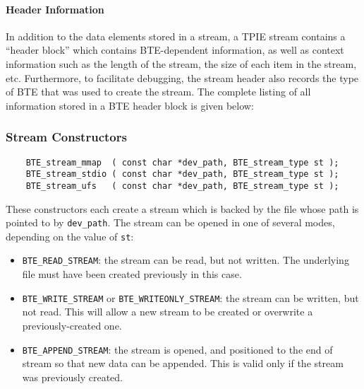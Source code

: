 
\paragraph{Header Information} In addition to the data elements stored
in a stream, a TPIE stream contains a ``header
block'' which contains BTE-dependent
information, as well as context information such as the length of the
stream, the size of each item in the stream, etc.  Furthermore, to
facilitate debugging, the stream header also records the type of BTE
that was used to create the stream. The complete listing of all
information stored in a BTE header block is given below:



\vspace*{\baselineskip}
\subsubsection{Stream Constructors}

\begin{lstlisting}
    BTE_stream_mmap  ( const char *dev_path, BTE_stream_type st );
    BTE_stream_stdio ( const char *dev_path, BTE_stream_type st );
    BTE_stream_ufs   ( const char *dev_path, BTE_stream_type st );
\end{lstlisting}

\noindent
These constructors each create a stream which is backed by the file
whose path is pointed to by \lstinline|dev_path|.  The stream can be
opened in one of several modes, depending on the value of
\lstinline|st|:

\begin{itemize}
  
\item \lstinline|BTE_READ_STREAM|: the stream can be read, but not
  written. The underlying file must have been created previously in
  this case.
\item \lstinline|BTE_WRITE_STREAM| or
  \lstinline|BTE_WRITEONLY_STREAM|: the stream can be written, but not
  read. This will allow a new stream to be created or overwrite a
  previously-created one.
  
\item \lstinline|BTE_APPEND_STREAM|: the stream is opened, and
  positioned to the end of stream so that new data can be appended.
  This is valid only if the stream was previously created.
\end{itemize}

